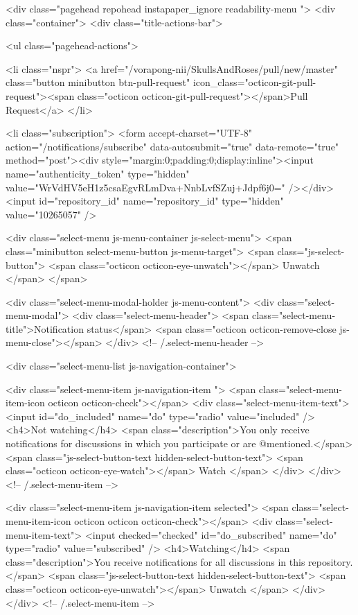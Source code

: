         <div class="pagehead repohead instapaper_ignore readability-menu ">
          <div class="container">
            <div class="title-actions-bar">
              

<ul class="pagehead-actions">

    <li class="nspr">
      <a href="/vorapong-nii/SkullsAndRoses/pull/new/master" class="button minibutton btn-pull-request" icon_class="octicon-git-pull-request"><span class="octicon octicon-git-pull-request"></span>Pull Request</a>
    </li>

    <li class="subscription">
      <form accept-charset="UTF-8" action="/notifications/subscribe" data-autosubmit="true" data-remote="true" method="post"><div style="margin:0;padding:0;display:inline"><input name="authenticity_token" type="hidden" value="WrVdHV5eH1z5csaEgvRLmDva+NnbLvfSZuj+Jdpf6j0=" /></div>  <input id="repository_id" name="repository_id" type="hidden" value="10265057" />

    <div class="select-menu js-menu-container js-select-menu">
      <span class="minibutton select-menu-button js-menu-target">
        <span class="js-select-button">
          <span class="octicon octicon-eye-unwatch"></span>
          Unwatch
        </span>
      </span>

      <div class="select-menu-modal-holder js-menu-content">
        <div class="select-menu-modal">
          <div class="select-menu-header">
            <span class="select-menu-title">Notification status</span>
            <span class="octicon octicon-remove-close js-menu-close"></span>
          </div> <!-- /.select-menu-header -->

          <div class="select-menu-list js-navigation-container">

            <div class="select-menu-item js-navigation-item ">
              <span class="select-menu-item-icon octicon octicon-check"></span>
              <div class="select-menu-item-text">
                <input id="do_included" name="do" type="radio" value="included" />
                <h4>Not watching</h4>
                <span class="description">You only receive notifications for discussions in which you participate or are @mentioned.</span>
                <span class="js-select-button-text hidden-select-button-text">
                  <span class="octicon octicon-eye-watch"></span>
                  Watch
                </span>
              </div>
            </div> <!-- /.select-menu-item -->

            <div class="select-menu-item js-navigation-item selected">
              <span class="select-menu-item-icon octicon octicon octicon-check"></span>
              <div class="select-menu-item-text">
                <input checked="checked" id="do_subscribed" name="do" type="radio" value="subscribed" />
                <h4>Watching</h4>
                <span class="description">You receive notifications for all discussions in this repository.</span>
                <span class="js-select-button-text hidden-select-button-text">
                  <span class="octicon octicon-eye-unwatch"></span>
                  Unwatch
                </span>
              </div>
            </div> <!-- /.select-menu-item -->

